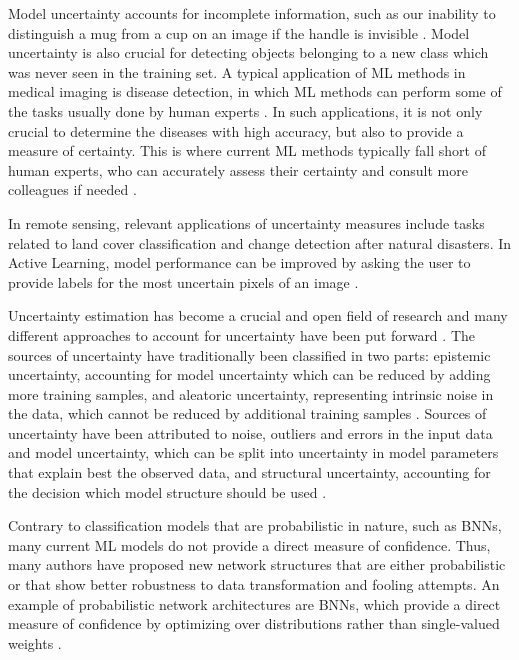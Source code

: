 \documentclass[10pt]{article}
\begin{document}
Model uncertainty accounts for incomplete information, such as our inability to distinguish a mug from a cup on an image if the handle is invisible \cite{Rupprecht2017LearningIA}. Model uncertainty is also crucial for detecting objects belonging to a new class which was never seen in the training set. A typical application of \gls{ML} methods in medical imaging is disease detection, in which \gls{ML} methods can perform some of the tasks usually done by human experts \cite{leibig2017}. In such applications, it is not only crucial to determine the diseases with high accuracy, but also to provide a measure of certainty. This is where current \gls{ML} methods typically fall short of human experts, who can accurately assess their certainty and consult more colleagues if needed \cite{leibig2017}.

In remote sensing, relevant applications of uncertainty measures include tasks related to land cover classification and change detection after natural disasters. In Active Learning, model performance can be improved by asking the user to provide labels for the most uncertain pixels of an image \cite{menderes_automatic_2015, womble_automated_2007, postadjian_investigating_2017, tuiaAL2011, Tuia2011ASO}. 


Uncertainty estimation has become a crucial and open field of research and many different approaches to account for uncertainty have been put forward \cite{Gal2016Uncertainty, Choi2017UncertaintyAwareLF, KendallG17, subramanya, leibig2017, Sun2018KSconfA}. The sources of uncertainty have traditionally been classified in two parts: epistemic uncertainty, accounting for model uncertainty which can be reduced by adding more training samples, and aleatoric uncertainty, representing intrinsic noise in the data, which cannot be reduced by additional training samples \cite{KendallG17}.  Sources of uncertainty have been attributed to noise, outliers and errors in the input data and model uncertainty, which can be split into uncertainty in model parameters that explain best the observed data, and structural uncertainty, accounting for the decision which model structure should be used \cite{Hammer2007HowTP, Gal2016Uncertainty}. 

Contrary to classification models that are probabilistic in nature, such as \glspl{BNN}, many current \gls{ML} models do not provide a direct measure of confidence. Thus, many authors have proposed new network structures that are either probabilistic or that show better robustness to data transformation and fooling attempts. An example of probabilistic network architectures are \glspl{BNN}, which provide a direct measure of confidence by optimizing over distributions rather than single-valued weights \cite{Gal2016Uncertainty, KendallG17}.
\end{document}
